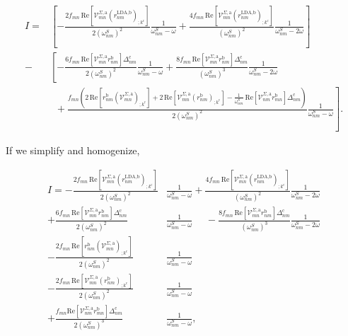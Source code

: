 \documentclass[11pt]{article}
\begin{document}
\begin{align*}
I
= &\left[-\frac{2f_{mn}\,\mathrm{Re}\left[\mathcal{V}^{\Sigma,\text{a}}_{mn}\left(r^{\text{LDA},\text{b}}_{nm}\right)_{;k^{\text{c}}}\right]}{2(\omega^{S}_{nm})^{2}}\frac{1}{\omega^{S}_{nm}-\omega} + \frac{4f_{mn}\,\mathrm{Re}\left[\mathcal{V}^{\Sigma,\text{a}}_{mn}\left(r^{\text{LDA},\text{b}}_{nm}\right)_{;k^{\text{c}}}\right]}{(\omega^{S}_{nm})^{2}}\frac{1}{\omega^{S}_{nm}-2\omega}\right]\nonumber\\
- &\left[-\frac{6f_{mn}\,\mathrm{Re}\left[\mathcal{V}^{\Sigma,\text{a}}_{mn}r^{\text{b}}_{nm}\right]\Delta^{\text{c}}_{nm}}{2(\omega^{S}_{nm})^{2}}\frac{1}{\omega^{S}_{nm}-\omega} 
+ \frac{8f_{mn}\,\mathrm{Re}\left[\mathcal{V}^{\Sigma,\text{a}}_{mn}r^{\text{b}}_{nm}\right]\Delta^{\text{c}}_{nm}}{(\omega^{S}_{nm})^{3}}\frac{1}{\omega^{S}_{nm}-2\omega}\right.\nonumber\\
&\,\,\,+ \left.\frac{f_{mn}\left(2\,\mathrm{Re}\left[r^{\text{b}}_{nm}\left(\mathcal{V}^{\Sigma,\text{a}}_{mn}\right)_{;k^{\text{c}}}\right] + 2\,\mathrm{Re}\left[\mathcal{V}^{\Sigma,\text{a}}_{mn}\left(r^{\text{b}}_{nm}\right)_{;k^{\text{c}}}\right] - \frac{1}{\omega^{S}_{nm}}\,\mathrm{Re}\left[\mathcal{V}^{\Sigma,\text{a}}_{nm}r^{\text{b}}_{mn}\right]\Delta_{nm}^{\text{c}}\right)}{2(\omega^{S}_{nm})^{2}}\frac{1}{\omega^S_{nm}-\omega}\right].
\end{align*}

If we simplify and homogenize,

\begin{align}\label{simplified_i} 
I =
-\frac{2f_{mn}\,\mathrm{Re}\left[\mathcal{V}^{\Sigma,\text{a}}_{mn}\left(r^{\text{LDA},\text{b}}_{nm}\right)_{;k^{\text{c}}}\right]}{2(\omega^{S}_{nm})^{2}}&\frac{1}{\omega^{S}_{nm}-\omega}
+ \frac{4f_{mn}\,\mathrm{Re}\left[\mathcal{V}^{\Sigma,\text{a}}_{mn}\left(r^{\text{LDA},\text{b}}_{nm}\right)_{;k^{\text{c}}}\right]}{(\omega^{S}_{nm})^{2}}\frac{1}{\omega^{S}_{nm}-2\omega}\nonumber\\
+ \frac{6f_{mn}\,\mathrm{Re}\left[\mathcal{V}^{\Sigma,\text{a}}_{mn}r^{\text{b}}_{nm}\right]\Delta^{\text{c}}_{nm}}{2(\omega^{S}_{nm})^{2}}&\frac{1}{\omega^{S}_{nm}-\omega} 
\quad\,\,- \frac{8f_{mn}\,\mathrm{Re}\left[\mathcal{V}^{\Sigma,\text{a}}_{mn}r^{\text{b}}_{nm}\right]\Delta^{\text{c}}_{nm}}{(\omega^{S}_{nm})^{3}}\frac{1}{\omega^{S}_{nm}-2\omega}\nonumber\\
- \frac{2f_{mn}\,\mathrm{Re}\left[r^{\text{b}}_{nm}\left(\mathcal{V}^{\Sigma,\text{a}}_{mn}\right)_{;k^{\text{c}}}\right]}{2(\omega^{S}_{nm})^{2}}&\frac{1}{\omega^{S}_{nm}-\omega}\nonumber\\
- \frac{2f_{mn}\,\mathrm{Re}\left[\mathcal{V}^{\Sigma,\text{a}}_{mn}\left(r^{\text{b}}_{nm}\right)_{;k^{\text{c}}}\right]}{2(\omega^{S}_{nm})^{2}}&\frac{1}{\omega^{S}_{nm}-\omega}\nonumber\\
+ \frac{f_{mn}\mathrm{Re}\left[\mathcal{V}^{\Sigma,\text{a}}_{nm}r^{\text{b}}_{mn}\right]\Delta_{nm}^{\text{c}}}{2(\omega^{S}_{nm})^{3}}&\frac{1}{\omega^{S}_{nm}-\omega},
\end{align}
\end{document}
